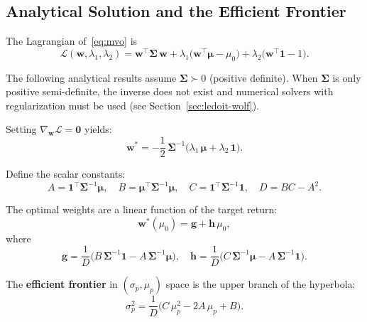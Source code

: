\documentclass[12pt,a4paper]{article}
\begin{document}
\subsection{Analytical Solution and the Efficient Frontier}

The Lagrangian of~\eqref{eq:mvo} is
\begin{equation}
    \mathcal{L}(\bm{w}, \lambda_1, \lambda_2) =
        \bm{w}^\top \bm{\Sigma}\,\bm{w}
        + \lambda_1\bigl(\bm{w}^\top\bm{\mu} - \mu_0\bigr)
        + \lambda_2\bigl(\bm{w}^\top\bm{1} - 1\bigr).
\end{equation}

The following analytical results assume $\bm{\Sigma} \succ 0$ (positive definite). When $\bm{\Sigma}$ is only positive semi-definite, the inverse does not exist and numerical solvers with regularization must be used (see Section~\ref{sec:ledoit-wolf}).

Setting $\nabla_{\bm{w}} \mathcal{L} = \bm{0}$ yields:
\begin{equation}
    \bm{w}^* = -\frac{1}{2}\,\bm{\Sigma}^{-1}\bigl(\lambda_1\,\bm{\mu} + \lambda_2\,\bm{1}\bigr).
    \label{eq:mvo-weights}
\end{equation}

Define the scalar constants:
\begin{equation}
    A = \bm{1}^\top \bm{\Sigma}^{-1} \bm{\mu}, \quad
    B = \bm{\mu}^\top \bm{\Sigma}^{-1} \bm{\mu}, \quad
    C = \bm{1}^\top \bm{\Sigma}^{-1} \bm{1}, \quad
    D = BC - A^2.
    \label{eq:mvo-constants}
\end{equation}

The optimal weights are a linear function of the target return:
\begin{equation}
    \bm{w}^*(\mu_0) = \bm{g} + \bm{h}\,\mu_0,
    \label{eq:two-fund}
\end{equation}
where
\begin{equation}
    \bm{g} = \frac{1}{D}\bigl(B\,\bm{\Sigma}^{-1}\bm{1} - A\,\bm{\Sigma}^{-1}\bm{\mu}\bigr), \quad
    \bm{h} = \frac{1}{D}\bigl(C\,\bm{\Sigma}^{-1}\bm{\mu} - A\,\bm{\Sigma}^{-1}\bm{1}\bigr).
\end{equation}

The \textbf{efficient frontier} in $(\sigma_p, \mu_p)$ space is the upper branch of the hyperbola:
\begin{equation}
    \sigma_p^2 = \frac{1}{D}\bigl(C\,\mu_p^2 - 2A\,\mu_p + B\bigr).
    \label{eq:frontier}
\end{equation}
\end{document}
